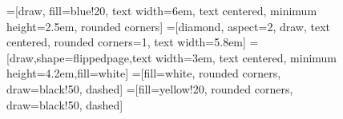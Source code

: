 \begin{figure}[H]


  \makeatletter

  =[draw, fill=blue!20, text width=6em, text centered, minimum height=2.5em, rounded corners]
  =[diamond, aspect=2, draw, text centered, rounded
  corners=1, text width=5.8em]
  =[draw,shape=flippedpage,text width=3em, text centered,
  minimum height=4.2em,fill=white]
  =[fill=white, rounded corners, draw=black!50, dashed]
  =[fill=yellow!20, rounded corners, draw=black!50, dashed]

  \begin{center}
  \begin{tikzpicture}[>=latex, on grid, auto, node distance=2.5cm]


\end{tikzpicture}
\end{center}
\end{figure}
